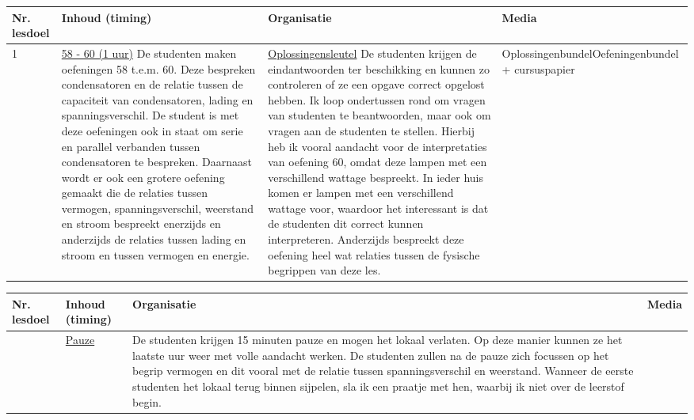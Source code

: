 \begin{landscape}
	
	\begin{tabularx}{1.56\textwidth}{|p{1.5cm}|p{6cm}|X|p{4cm}|}
		\hline
		\textbf{Nr. lesdoel } & \textbf{Inhoud (timing)}  & \textbf{Organisatie } & \textbf{Media } \\ \hline
		1\newline 2\newline 3\newline 8&\underline{58 - 60 (1 uur)}
	    De studenten maken oefeningen 58 t.e.m. 60. Deze bespreken condensatoren en de relatie tussen de capaciteit van condensatoren, lading en spanningsverschil. De student is met deze oefeningen ook in staat om serie en parallel verbanden tussen condensatoren te bespreken. Daarnaast wordt er ook een grotere oefening gemaakt die de relaties tussen vermogen, spanningsverschil, weerstand en stroom bespreekt enerzijds en anderzijds de relaties tussen lading en stroom en tussen vermogen en energie.
	    &  \underline{Oplossingensleutel}
	    	De studenten krijgen de eindantwoorden ter beschikking en kunnen zo controleren of ze een opgave correct opgelost hebben. Ik loop ondertussen rond om vragen van studenten te beantwoorden, maar ook om vragen aan de studenten te stellen. Hierbij heb ik vooral aandacht voor de interpretaties van oefening 60, omdat deze lampen met een verschillend wattage bespreekt. In ieder huis komen er lampen met een verschillend wattage voor, waardoor het interessant is dat de studenten dit correct kunnen interpreteren. Anderzijds bespreekt deze oefening heel wat relaties tussen de fysische begrippen van deze les. 
	    
		& Oplossingenbundel\newline Oefeningenbundel + cursuspapier
		\\ \hline
	\end{tabularx}
	
	
	
	\begin{tabularx}{1.56\textwidth}{|p{1.5cm}|p{6cm}|X|p{4cm}|}
		\hline
		\textbf{Nr. lesdoel } & \textbf{Inhoud (timing)}  & \textbf{Organisatie } & \textbf{Media } \\ \hline
		&\underline{Pauze}\newline
		
		
		&    De studenten krijgen 15 minuten pauze en mogen het lokaal verlaten. Op deze manier kunnen ze het laatste uur weer met volle aandacht werken. De studenten zullen na de pauze zich focussen op het begrip vermogen en dit vooral met de relatie tussen spanningsverschil en weerstand. \newline
		Wanneer de eerste studenten het lokaal terug binnen sijpelen, sla ik een praatje met hen, waarbij ik niet over de leerstof begin. 
		& 
		\\ \hline
	\end{tabularx}
	

\end{landscape}
